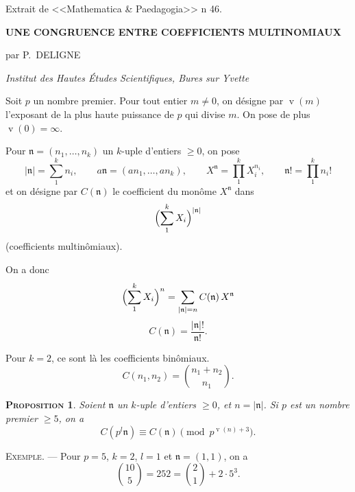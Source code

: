 \documentclass[12pt]{amsart}
\theoremstyle{plain}
\newtheorem{prop}{\textsc{Proposition}}
\DeclareMathOperator{\vord}{v}
\begin{document}
\begin{flushright}
\small Extrait de <<Mathematica \& Paedagogia>> n\textdegree{} 46.
\end{flushright}

\begin{center}
\textbf{UNE CONGRUENCE ENTRE COEFFICIENTS MULTINOMIAUX}

\smallskip
\small par P.~DELIGNE

\smallskip
\footnotesize\textit{Institut des Hautes \'Etudes Scientifiques, Bures sur Yvette}
\end{center}

Soit $p$ un nombre premier. Pour tout entier $m \neq 0$, on d\'esigne par $\vord(m)$
l'exposant de la plus haute puissance de $p$ qui divise $m$. On pose de plus
$\vord(0) = \infty$.

Pour $\mathfrak{n} = (n_1, \dots, n_k)$ un $k$-uple d'entiers $\geqslant 0$, on pose
\[
|\mathfrak{n}| = \sum_1^k n_i, \qquad
a\mathfrak{n} = (an_1, \dots, an_k), \qquad
X^{\mathfrak{n}} = \prod_1^k X_i^{n_i}, \qquad
\mathfrak{n}! = \prod_1^k n_i!
\]
et on d\'esigne par $C(\mathfrak{n})$ le coefficient du mon\^ome $X^{\mathfrak{n}}$ dans
\[
\Bigl(\sum_1^k X_i\Bigr)^{|\mathfrak{n}|}
\]
(coefficients multin\^omiaux).

On a donc
\begin{equation}
\Bigl(\sum_1^k X_i\Bigr)^n = \sum_{|\mathfrak{n}|=n} C(\mathfrak{n})\, X^{\mathfrak{n}}
\end{equation}
\begin{equation}
C(\mathfrak{n}) = \frac{|\mathfrak{n}|!}{\mathfrak{n}!}.\tag{2}
\end{equation}

Pour $k = 2$, ce sont l\`a les coefficients bin\^omiaux.
\begin{equation}
C(n_1, n_2) = \binom{n_1 + n_2}{n_1}.\tag{3}
\end{equation}

\begin{prop}
Soient $\mathfrak{n}$ un $k$-uple d'entiers $\geqslant 0$, et $n = |\mathfrak{n}|$. Si $p$ est
un nombre premier $\geqslant 5$, on a
\begin{equation}
C(p^l \mathfrak{n}) \equiv C(\mathfrak{n}) \pmod{p^{\vord(n)+3}}.\tag{4}
\end{equation}
\end{prop}

\noindent\textsc{Exemple.} --- Pour $p = 5$, $k = 2$, $l = 1$ et $\mathfrak{n} = (1,1)$, on a
\[
\binom{10}{5} = 252 = \binom{2}{1} + 2 \cdot 5^3.
\]
\end{document}
